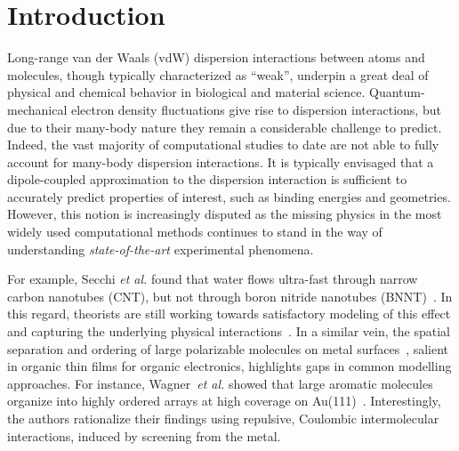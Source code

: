 \documentclass[aps,prl,groupaddress, twocolumn]{revtex4-1}  %
\begin{document}
\section*{Introduction}
Long-range van der Waals (vdW) dispersion interactions between atoms and molecules, though typically characterized as ``weak'', underpin a great deal of physical and chemical behavior in biological and material science. %
Quantum-mechanical electron density fluctuations give rise to dispersion interactions, but due to their many-body nature they remain a considerable challenge to predict.
Indeed, the vast majority of computational studies to date are not able to fully account for many-body dispersion interactions. It is typically envisaged that a dipole-coupled approximation to the dispersion interaction is sufficient to accurately predict properties of interest, such as binding energies and geometries. However, this notion is increasingly disputed as the missing physics in the most widely used computational methods continues to stand in the way of understanding \textit{state-of-the-art} experimental phenomena.

For example, Secchi \textit{et al.} found that water flows ultra-fast through narrow carbon nanotubes (CNT), but not through boron nitride nanotubes (BNNT)~\cite{secchi2016massive}. In this regard, theorists are still working towards satisfactory modeling of this effect and capturing the underlying physical interactions~\cite{Michaelides2016,Kannam2013,Striolo2016,Mattia2015266}. In a similar vein, the spatial separation and ordering of large polarizable molecules on metal surfaces~\cite{Wagner2010,Thussing2016}, salient in organic thin films for organic electronics, highlights gaps in common modelling approaches. For instance, Wagner~\textit{et al.} showed that large aromatic molecules organize into highly ordered arrays at high coverage on Au(111)~\cite{Wagner2010}. Interestingly, the authors rationalize their findings using repulsive, Coulombic intermolecular interactions, induced by screening from the metal.  %
\end{document}
